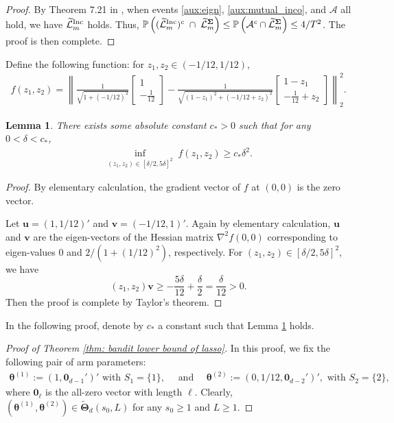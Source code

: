 \documentclass[aos,preprint]{imsart}
\theoremstyle{plain}
\newtheorem{lemma}[theorem]{Lemma}
\theoremstyle{definition}
\newcommand{\bTheta}{\boldsymbol{\Theta}}
\newcommand{\btheta}{\boldsymbol{\theta}}
\newcommand{\bd}[1]{\boldsymbol{#1}}
\newcommand{\bSigma}{\boldsymbol{\Sigma}}
\newcommand{\bu}{\boldsymbol{u}}
\newcommand{\bv}{\boldsymbol{v}}
\newcommand{\cA}{\mathcal{A}}
\newcommand{\Pro}{\mathbb{P}}
\newcommand{\tL}{\widetilde{\mathcal{L}}}
\begin{document}
\begin{appendix}
\begin{proof}
By Theorem 7.21 in \cite{wainwright2019high}, when events \eqref{aux:eign}, \eqref{aux:mutual_inco}, and $\cA$ all hold, we have $\tL_m^{\textup{Inc}}$ holds. Thus,
$\Pro\left((\tL_m^{\textup{Inc}})^c\; \cap\; \tL_m^{\bSigma}\right)\le \Pro\left( \mathcal{A}^c \cap \tL_m^{\bSigma}\right) \leq 4/T^2$. The proof is then complete.
\end{proof}

Define the following function: for $z_1,z_2 \in (-1/12,1/12)$,
\begin{align}
    \label{def:elementary_func}
    f(z_1, z_2) = \left\|\frac{1}{\sqrt{1 + (-1/12)^2}}\begin{bmatrix}
        1  \\
        -\frac{1}{12} 
    \end{bmatrix} - \frac{1}{\sqrt{(1-z_1)^2 + (-1/12+z_2)^2}}\begin{bmatrix}
        1 - z_1 \\
        -\frac{1}{12} + z_2
    \end{bmatrix}  \right\|_2^2.
\end{align}


\begin{lemma}
\label{lemma:elementary}
There exists some absolute constant $c_* > 0$ such that for any $0 < \delta < c_*$, 
\begin{align*}
   \inf_{(z_1, z_2) \in [\delta/2, 5\delta]^2}\; f(z_1, z_2) \geq c_* \delta^2.
\end{align*}
\end{lemma}
\begin{proof}
By elementary calculation, the gradient vector of $f$ at $(0,0)$ is the zero vector. 

Let $\bu = (1,1/12)'$ and $\bv = (-1/12,1)'$. Again by elementary calculation,  $\bu$ and $\bv$ are the eigen-vectors of the Hessian matrix $ \nabla^2 f(0,0)$ corresponding to eigen-values $0$ and $2/(1+(1/12)^2)$, respectively.  
For $(z_1, z_2) \in [\delta/2, 5\delta]^2$, we have
$$
(z_1,z_2) \bv  \geq - \frac{5\delta}{12} + \frac{\delta}{2}  =\frac{\delta}{12} > 0.
$$
Then the proof is complete by Taylor's theorem.
 \end{proof}

In the following proof, denote by $c_*$ a constant such that Lemma \ref{lemma:elementary} holds.

\begin{proof}[Proof of Theorem \ref{thm: bandit lower bound of lasso}]
In this proof, we fix the following pair of arm parameters:
\begin{align*}
    \btheta^{(1)} := (1, \bd{0}_{d-1}')' \text{ with } S_1 = \{1\}, \quad \text{ and } \quad
    \btheta^{(2)} := (0, 1/12, \bd{0}_{d-2}')', \text{ with } S_2 = \{2\},
\end{align*}
where $\bd{0}_{\ell}$ is the all-zero vector with length $\ell$. Clearly, $(\btheta^{(1)},\btheta^{(2)}) \in  \widetilde{\bTheta}_{d}(s_0,L)$ for any $s_0 \geq 1$ and $L \geq 1$.


\end{proof}
\end{appendix}
\end{document}
